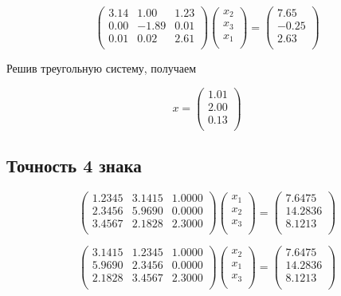 \documentclass[11pt,a4paper,oneside]{article}
\begin{document}
$$ \left(\begin{matrix}
3.14 & 1.00 & 1.23 \\
0.00 & -1.89 & 0.01 \\
0.01 & 0.02 & 2.61 \\
\end{matrix}\right)
\left(\begin{matrix}
x_2 \\
x_3 \\
x_1 \\
\end{matrix}\right)
=
\left(\begin{matrix}
7.65 \\
-0.25 \\
2.63 \\
\end{matrix}\right) $$

Решив треугольную систему, получаем

$$ x = \left( \begin{matrix}
	1.01 \\
	2.00 \\
	0.13 \\
\end{matrix} \right) $$

\subsection{Точность 4 знака}

$$ \left(\begin{matrix}
1.2345 & 3.1415 & 1.0000 \\
2.3456 & 5.9690 & 0.0000 \\
3.4567 & 2.1828 & 2.3000 \\
\end{matrix}\right)
\left(\begin{matrix}
x_1 \\
x_2 \\
x_3 \\
\end{matrix}\right)
=
\left(\begin{matrix}
7.6475 \\
14.2836 \\
8.1213 \\
\end{matrix}\right) $$

$$ \left(\begin{matrix}
3.1415 & 1.2345 & 1.0000 \\
5.9690 & 2.3456 & 0.0000 \\
2.1828 & 3.4567 & 2.3000 \\
\end{matrix}\right)
\left(\begin{matrix}
x_2 \\
x_1 \\
x_3 \\
\end{matrix}\right)
=
\left(\begin{matrix}
7.6475 \\
14.2836 \\
8.1213 \\
\end{matrix}\right) $$
\end{document}
